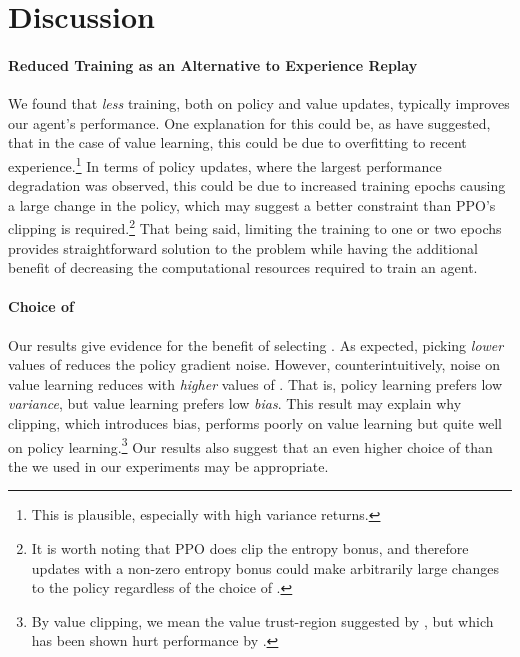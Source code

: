 \documentclass{article}
\begin{document}
\section{Discussion}
\label{sec:discussion}

\paragraph{Reduced Training as an Alternative to Experience Replay}

We found that \textit{less} training, both on policy and value updates, typically improves our agent's performance. One explanation for this could be, as \cite{cobbe2021phasic} have suggested, that in the case of value learning, this could be due to overfitting to recent experience.\footnote{This is plausible, especially with high variance returns.} In terms of policy updates, where the largest performance degradation was observed, this could be due to increased training epochs causing a large change in the policy, which may suggest a better constraint than PPO's clipping is required.\footnote{It is worth noting that PPO does clip the entropy bonus, and therefore updates with a non-zero entropy bonus could make arbitrarily large changes to the policy regardless of the choice of .} That being said, limiting the training to one or two epochs provides straightforward solution to the problem while having the additional benefit of decreasing the computational resources required to train an agent. 

\paragraph{Choice of }

Our results give evidence for the benefit of selecting . As expected, picking \textit{lower} values of  reduces the policy gradient noise. However, counterintuitively, noise on value learning reduces with \textit{higher} values of . That is, policy learning prefers low \textit{variance}, but value learning prefers low \textit{bias}. This result may explain why clipping, which introduces bias, performs poorly on value learning but quite well on policy learning.\footnote{By value clipping, we mean the value trust-region suggested by \cite{schulman2015high}, but which has been shown hurt performance by \cite{andrychowicz2020matters}.} Our results also suggest that an even higher choice of  than the  we used in our experiments may be appropriate.
\end{document}
